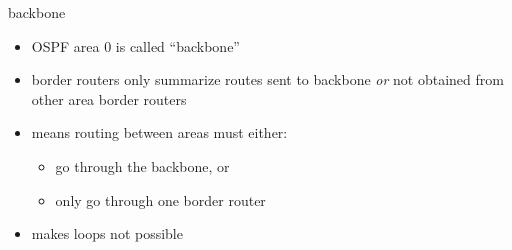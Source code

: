 \begin{frame}{backbone}
    \begin{itemize}
    \item OSPF area 0 is called ``backbone''
    \item border routers only summarize routes sent to backbone \textit{or}
        not obtained from other area border routers
    \vspace{.5cm}
    \item means routing between areas must either:
        \begin{itemize}
        \item go through the backbone, or
        \item only go through one border router
        \end{itemize}
    \item makes loops not possible
    \end{itemize}
\end{frame}

